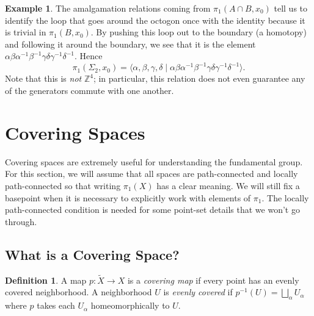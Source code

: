 \documentclass{article}
\theoremstyle{definition}
\newtheorem{defi}[thm]{Definition}
\newtheorem{exa}[thm]{Example}
\theoremstyle{remark}
\newcommand{\Z}{\mathbb Z}
\numberwithin{figure}{section}
\begin{document}
\begin{exa}
	The amalgamation relations coming from $\pi_1(A \cap B, x_0)$ tell us to identify the loop that goes around the octogon once with the identity because it is trivial in $\pi_1(B, x_0)$. By pushing this loop out to the boundary (a homotopy) and following it around the boundary, we see that it is the element $\alpha\beta\alpha^{-1}\beta^{-1}\gamma\delta\gamma^{-1}\delta^{-1}$. Hence
	\[
	\pi_1(\Sigma_2, x_0) = \langle \alpha, \beta, \gamma, \delta \mid \alpha\beta\alpha^{-1}\beta^{-1}\gamma\delta\gamma^{-1}\delta^{-1} \rangle.
	\]
	Note that this is \emph{not} $\Z^4$; in particular, this relation does not even guarantee any of the generators commute with one another.
\end{exa}

\newpage
\section{Covering Spaces}
Covering spaces are extremely useful for understanding the fundamental group. For this section, we will assume that all spaces are path-connected and locally path-connected so that writing $\pi_1(X)$ has a clear meaning. We will still fix a basepoint when it is necessary to explicitly work with elements of $\pi_1$. The locally path-connected condition is needed for some point-set details that we won't go through.

\subsection{What is a Covering Space?}

\begin{defi}
	A map $p : \tilde X \to X$ is a \emph{covering map} if every point has an evenly covered neighborhood. A neighborhood $U$ is \emph{evenly covered} if $p^{-1}(U) = \bigsqcup_\alpha U_\alpha$ where $p$ takes each $U_\alpha$ homeomorphically to $U$.
\end{defi}
\end{document}

